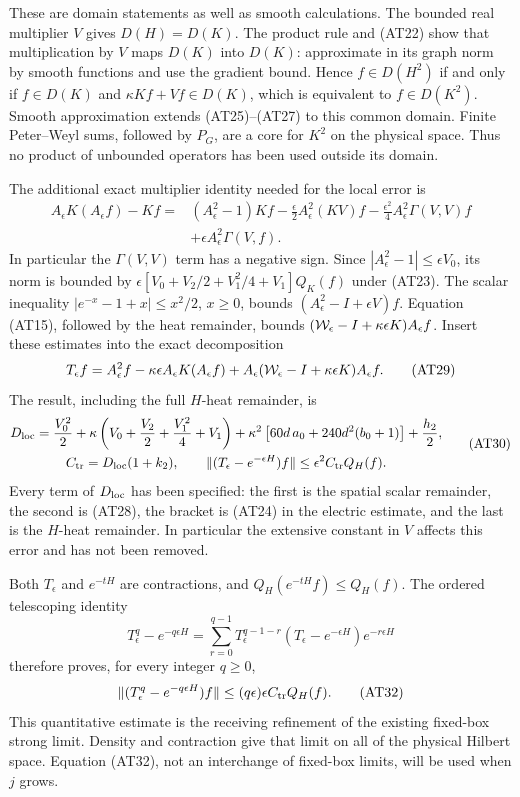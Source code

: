 \documentclass[11pt]{article}
\begin{document}
These are domain statements as well as smooth calculations. The bounded real multiplier \(V\) gives \(D(H)=D(K)\). The product rule and (AT22) show that multiplication by \(V\) maps \(D(K)\) into \(D(K)\): approximate in its graph norm by smooth functions and use the gradient bound. Hence \(f\in D(H^2)\) if and only if \(f\in D(K)\) and \(\kappa Kf+Vf\in D(K)\), which is equivalent to \(f\in D(K^2)\). Smooth approximation extends (AT25)–(AT27) to this common domain. Finite Peter–Weyl sums, followed by \(P_G\), are a core for \(K^2\) on the physical space. Thus no product of unbounded operators has been used outside its domain.

The additional exact multiplier identity needed for the local error is
\[
 \begin{aligned}
 A_\epsilon K(A_\epsilon f)-Kf
  ={}&(A_\epsilon^2-1)Kf
      -\frac{\epsilon}{2}A_\epsilon^2(KV)f
      -\frac{\epsilon^2}{4}A_\epsilon^2\Gamma(V,V)f\\
     &+\epsilon A_\epsilon^2\Gamma(V,f).
 \end{aligned}\tag{AT28}
\]
In particular the \(\Gamma(V,V)\) term has a negative sign. Since
\(|A_\epsilon^2-1|\le\epsilon V_0\), its norm is bounded by
\(\epsilon[V_0+V_2/2+V_1^2/4+V_1]Q_K(f)\) under (AT23).
The scalar inequality
\(|e^{-x}-1+x|\le x^2/2\), \(x\ge0\), bounds
\((A_\epsilon^2-I+\epsilon V)f\).
Equation (AT15), followed by the heat remainder, bounds
\(({\cal W}_\epsilon-I+\kappa\epsilon K)A_\epsilon f\).
Insert these estimates into the exact decomposition
\[
 T_\epsilon f=A_\epsilon^2f-\kappa\epsilon A_\epsilon K(A_\epsilon f)
          +A_\epsilon({\cal W}_\epsilon-I+\kappa\epsilon K)A_\epsilon f.
 \tag{AT29}
\]
The result, including the full \(H\)-heat remainder, is
\[
 \begin{gathered}
 D_{\rm loc}=\frac{V_0^2}{2}
   +\kappa\left(V_0+\frac{V_2}{2}+\frac{V_1^2}{4}+V_1\right)
   +\kappa^2\left[
       60d\,a_0+
       240d^2(b_0+1)\right]+\frac{h_2}{2},\\
 C_{\rm tr}=D_{\rm loc}(1+k_2),\qquad
 \|(T_\epsilon-e^{-\epsilon H})f\|
                  \le\epsilon^2 C_{\rm tr}Q_H(f).
 \end{gathered}\tag{AT30}
\]
Every term of \(D_{\rm loc}\) has been specified: the first is the spatial scalar remainder, the second is (AT28), the bracket is (AT24) in the electric estimate, and the last is the \(H\)-heat remainder. In particular the extensive constant in \(V\) affects this error and has not been removed.

Both \(T_\epsilon\) and \(e^{-tH}\) are contractions, and
\(Q_H(e^{-tH}f)\le Q_H(f)\). The ordered telescoping identity
\[
 T_\epsilon^q-e^{-q\epsilon H}
 =\sum_{r=0}^{q-1}T_\epsilon^{q-1-r}
       (T_\epsilon-e^{-\epsilon H})e^{-r\epsilon H}
 \tag{AT31}
\]
therefore proves, for every integer \(q\ge0\),
\[
 \|(T_\epsilon^q-e^{-q\epsilon H})f\|
                  \le(q\epsilon)\epsilon C_{\rm tr}Q_H(f).
 \tag{AT32}
\]
This quantitative estimate is the receiving refinement of the existing fixed-box strong limit. Density and contraction give that limit on all of the physical Hilbert space. Equation (AT32), not an interchange of fixed-box limits, will be used when \(j\) grows.
\end{document}
